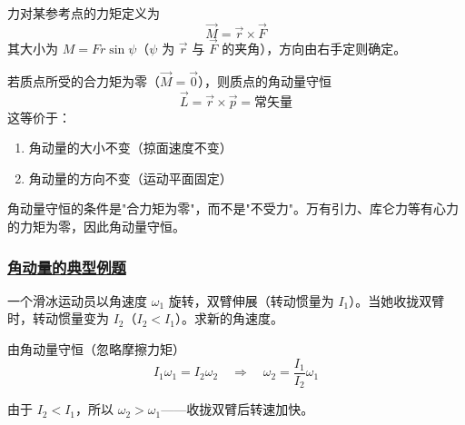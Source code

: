 \begin{definition}[力矩]
    力对某参考点的力矩定义为
    \begin{equation}
        \vec{M} = \vec{r} \times \vec{F}
    \end{equation}
    其大小为 $M = Fr\sin\psi$（$\psi$ 为 $\vec{r}$ 与 $\vec{F}$ 的夹角），方向由右手定则确定。
\end{definition}

\begin{theorem}[角动量守恒定律]
    若质点所受的合力矩为零（$\vec{M} = \vec{0}$），则质点的角动量守恒
    \begin{equation}
        \vec{L} = \vec{r} \times \vec{p} = \text{常矢量}
    \end{equation}
    这等价于：
    \begin{enumerate}
        \item 角动量的大小不变（掠面速度不变）
        \item 角动量的方向不变（运动平面固定）
    \end{enumerate}
\end{theorem}

\begin{remark}
    角动量守恒的条件是"合力矩为零"，而不是"不受力"。万有引力、库仑力等有心力的力矩为零，因此角动量守恒。
\end{remark}

\subsubsection{\protect\hyperlink{:}{角动量的典型例题}}

\begin{example}
    一个滑冰运动员以角速度 $\omega_1$ 旋转，双臂伸展（转动惯量为 $I_1$）。当她收拢双臂时，转动惯量变为 $I_2$（$I_2 < I_1$）。求新的角速度。
    \begin{solution}
        由角动量守恒（忽略摩擦力矩）
        \begin{equation}
            I_1\omega_1 = I_2\omega_2 \quad \Longrightarrow \quad \omega_2 = \frac{I_1}{I_2}\omega_1
        \end{equation}
        
        由于 $I_2 < I_1$，所以 $\omega_2 > \omega_1$——收拢双臂后转速加快。
    \end{solution}
\end{example}

